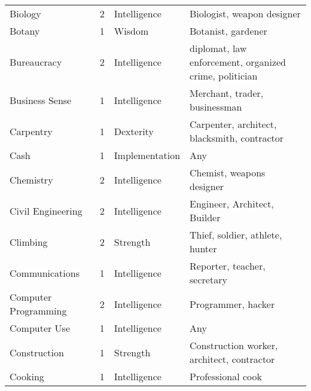 \documentclass[twoside]{book}
\begin{document}
\begin{longtable}{p{1.25in}llp{12em}}
  \raggedright
           Biology 
  &
   2 
  &
   Intelligence 
  &
   Biologist, weapon
           designer 
  \tabularnewline
      
  \raggedright
           Botany 
  &
   1 
  &
   Wisdom 
  &
   Botanist, gardener
           
  \tabularnewline
      
  \raggedright
           Bureaucracy 
  &
   2 
  &
   Intelligence 
  &
   diplomat, law
           enforcement, organized crime, politician 
  \tabularnewline
      
  \raggedright
           Business Sense 
  &
   1 
  &
   Intelligence 
  &
   Merchant, trader,
           businessman 
  \tabularnewline
      
  \raggedright
           Carpentry 
  &
   1 
  &
   Dexterity 
  &
   Carpenter, architect,
           blacksmith, contractor 
  \tabularnewline
      
  \raggedright
           Cash 
  &
   1 
  &
   Implementation 
  &
   Any 
  \tabularnewline
      
  \raggedright
           Chemistry 
  &
   2 
  &
   Intelligence 
  &
   Chemist, weapons designer
           
  \tabularnewline
      
  \raggedright
           Civil Engineering 
  &
   2 
  &
   Intelligence 
  &
   Engineer, Architect,
           Builder 
  \tabularnewline
      
  \raggedright
           Climbing 
  &
   2 
  &
   Strength 
  &
   Thief, soldier, athlete,
           hunter 
  \tabularnewline
      
  \raggedright
           Communications 
  &
   1 
  &
   Intelligence 
  &
   Reporter, teacher,
           secretary 
  \tabularnewline
      
  \raggedright
           Computer Programming 
  &
   2 
  &
   Intelligence 
  &
   Programmer, hacker
           
  \tabularnewline
      
  \raggedright
           Computer Use 
  &
   1 
  &
   Intelligence 
  &
   Any 
  \tabularnewline
      
  \raggedright
           Construction 
  &
   1 
  &
   Strength 
  &
   Construction worker,
           architect, contractor 
  \tabularnewline
      
  \raggedright
           Cooking 
  &
   1 
  &
   Intelligence 
  &
   Professional cook
           
  \tabularnewline
      

\end{longtable}
\end{document}
